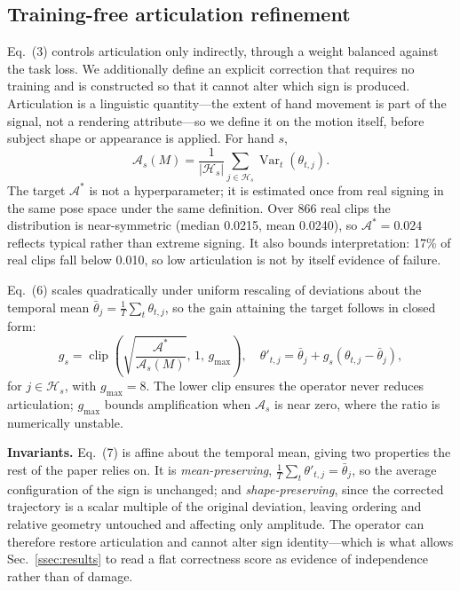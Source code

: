 \documentclass{article}
\begin{document}
\subsection{Training-free articulation refinement}
\label{ssec:refine}

Eq.~(3) controls articulation only indirectly, through a weight balanced against
the task loss. We additionally define an explicit correction that requires no
training and is constructed so that it cannot alter which sign is produced.
Articulation is a linguistic quantity---the extent of hand movement is part of
the signal, not a rendering attribute---so we define it on the motion itself,
before subject shape or appearance is applied. For hand $s$,
\begin{equation}
    \mathcal{A}_s(M) = \frac{1}{|\mathcal{H}_s|}
    \sum_{j \in \mathcal{H}_s} \operatorname{Var}_t(\theta_{t,j}).
\end{equation}
The target $\mathcal{A}^{*}$ is not a hyperparameter; it is estimated once from
real signing in the same pose space under the same definition. Over 866 real
clips the distribution is near-symmetric (median 0.0215, mean 0.0240), so
$\mathcal{A}^{*} = 0.024$ reflects typical rather than extreme signing. It also
bounds interpretation: 17\% of real clips fall below 0.010, so low articulation
is not by itself evidence of failure.

Eq.~(6) scales quadratically under uniform rescaling of deviations about the
temporal mean $\bar{\theta}_j = \frac{1}{T}\sum_t \theta_{t,j}$, so the gain
attaining the target follows in closed form:
\begin{equation}
    g_s = \operatorname{clip}\!\left(\sqrt{\frac{\mathcal{A}^{*}}{\mathcal{A}_s(M)}},\,1,\,g_{\max}\right),
    \quad
    \theta'_{t,j} = \bar{\theta}_j + g_s\left(\theta_{t,j} - \bar{\theta}_j\right),
\end{equation}
for $j \in \mathcal{H}_s$, with $g_{\max} = 8$. The lower clip ensures the
operator never reduces articulation; $g_{\max}$ bounds amplification when
$\mathcal{A}_s$ is near zero, where the ratio is numerically unstable.

\noindent\textbf{Invariants.} Eq.~(7) is affine about the temporal mean, giving
two properties the rest of the paper relies on. It is \emph{mean-preserving},
$\frac{1}{T}\sum_t \theta'_{t,j} = \bar{\theta}_j$, so the average configuration
of the sign is unchanged; and \emph{shape-preserving}, since the corrected
trajectory is a scalar multiple of the original deviation, leaving ordering and
relative geometry untouched and affecting only amplitude. The operator can
therefore restore articulation and cannot alter sign identity---which is what
allows Sec.~\ref{ssec:results} to read a flat correctness score as evidence of
independence rather than of damage.
\end{document}
